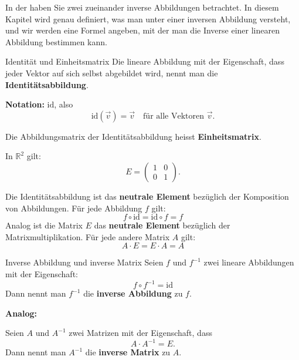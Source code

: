 

















\clearpage
In der  haben Sie zwei zueinander inverse Abbildungen betrachtet. In diesem Kapitel wird genau definiert, was man unter einer inversen Abbildung versteht, und wir werden eine Formel angeben, mit der man die Inverse einer linearen Abbildung bestimmen kann.

\begin{definition}
    {Identität und Einheitsmatrix}{}
    Die lineare Abbildung mit der Eigenschaft, dass jeder Vektor auf sich selbst abgebildet wird, nennt man die \textbf{Identitätsabbildung}.  

\textbf{Notation:} \( \text{id} \), also  
\[
\text{id}(\vec{v}) = \vec{v} \quad \text{für alle Vektoren } \vec{v}.
\]

Die Abbildungsmatrix der Identitätsabbildung heisst \textbf{Einheitsmatrix}.  

In \( \mathbb{R}^2 \) gilt:
\[
E = \begin{pmatrix} 1 & 0 \\ 0 & 1 \end{pmatrix}.
\]

\end{definition}
Die Identitätsabbildung ist das \textbf{neutrale Element} bezüglich der Komposition von Abbildungen. Für jede Abbildung \( f \) gilt:
\[
f \circ \text{id} = \text{id} \circ f = f
\]
Analog ist die Matrix \( E \) das \textbf{neutrale Element} bezüglich der Matrixmultiplikation. Für jede andere Matrix \( A \) gilt:
\[
A \cdot E = E \cdot A = A
\]

\begin{definition}
    {Inverse Abbildung und inverse Matrix}{}
    Seien \( f \) und \( f^{-1} \) zwei lineare Abbildungen mit der Eigenschaft:
    \[
    f \circ f^{-1} = \text{id}
    \]
    Dann nennt man \( f^{-1} \) die \textbf{inverse Abbildung} zu \( f \).

    \textbf{Analog:}  

    Seien \( A \) und \( A^{-1} \) zwei Matrizen mit der Eigenschaft, dass
    \[
    A \cdot A^{-1} = E.
    \]
    Dann nennt man \( A^{-1} \) die \textbf{inverse Matrix} zu \( A \).
\end{definition}

